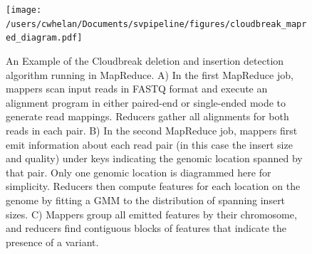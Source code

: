 \begin{figure}
\centering
\texttt{[image: /users/cwhelan/Documents/svpipeline/figures/cloudbreak\_mapred\_diagram.pdf]}
\caption{An Example of the Cloudbreak deletion and insertion detection algorithm running in MapReduce. A) In the first MapReduce job, mappers scan input reads in FASTQ format and execute an alignment program in either paired-end or single-ended mode to generate read mappings. Reducers gather all alignments for both reads in each pair. B) In the second MapReduce job, mappers first emit information about each read pair (in this case the insert size and quality) under keys indicating the genomic location spanned by that pair. Only one genomic location is diagrammed here for simplicity. Reducers then compute features for each location on the genome by fitting a GMM to the distribution of spanning insert sizes. C) Mappers group all emitted features by their chromosome, and reducers find contiguous blocks of features that indicate the presence of a variant.}
\label{cloudbreak_example}
\end{figure}

